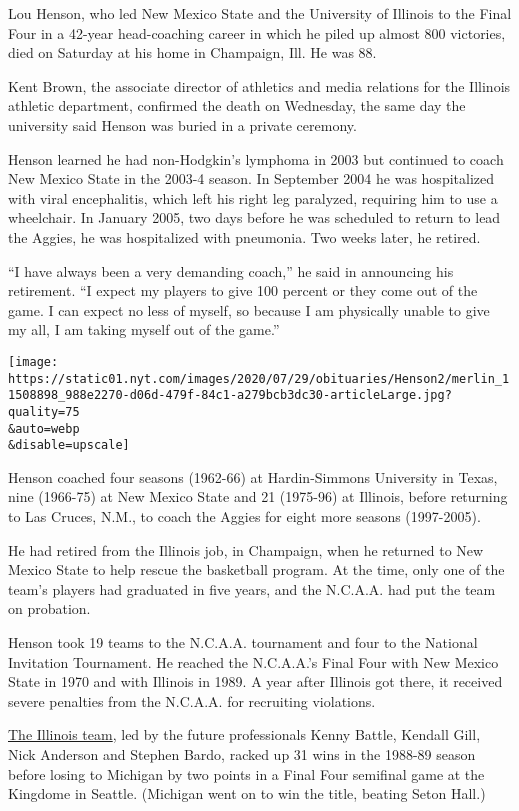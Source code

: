 Lou Henson, who led New Mexico State and the University of Illinois to
the Final Four in a 42-year head-coaching career in which he piled up
almost 800 victories, died on Saturday at his home in Champaign, Ill. He
was 88.

Kent Brown, the associate director of athletics and media relations for
the Illinois athletic department, confirmed the death on Wednesday, the
same day the university said Henson was buried in a private ceremony.

Henson learned he had non-Hodgkin's lymphoma in 2003 but continued to
coach New Mexico State in the 2003-4 season. In September 2004 he was
hospitalized with viral encephalitis, which left his right leg
paralyzed, requiring him to use a wheelchair. In January 2005, two days
before he was scheduled to return to lead the Aggies, he was
hospitalized with pneumonia. Two weeks later, he retired.

``I have always been a very demanding coach,'' he said in announcing his
retirement. ``I expect my players to give 100 percent or they come out
of the game. I can expect no less of myself, so because I am physically
unable to give my all, I am taking myself out of the game.''

\texttt{[image: https://static01.nyt.com/images/2020/07/29/obituaries/Henson2/merlin\_11508898\_988e2270-d06d-479f-84c1-a279bcb3dc30-articleLarge.jpg?quality=75\\\&auto=webp\\\&disable=upscale]}

Henson coached four seasons (1962-66) at Hardin-Simmons University in
Texas, nine (1966-75) at New Mexico State and 21 (1975-96) at Illinois,
before returning to Las Cruces, N.M., to coach the Aggies for eight more
seasons (1997-2005).

He had retired from the Illinois job, in Champaign, when he returned to
New Mexico State to help rescue the basketball program. At the time,
only one of the team's players had graduated in five years, and the
N.C.A.A. had put the team on probation.

Henson took 19 teams to the N.C.A.A. tournament and four to the National
Invitation Tournament. He reached the N.C.A.A.'s Final Four with New
Mexico State in 1970 and with Illinois in 1989. A year after Illinois
got there, it received severe penalties from the N.C.A.A. for recruiting
violations.

\href{https://www.thechampaignroom.com/2018/10/25/18006802/university-of-illinois-fighting-illini-basketball-flyin-illini-30-year-anniversary-lou-henson}{The
Illinois team}, led by the future professionals Kenny Battle, Kendall
Gill, Nick Anderson and Stephen Bardo, racked up 31 wins in the 1988-89
season before losing to Michigan by two points in a Final Four semifinal
game at the Kingdome in Seattle. (Michigan went on to win the title,
beating Seton Hall.)

